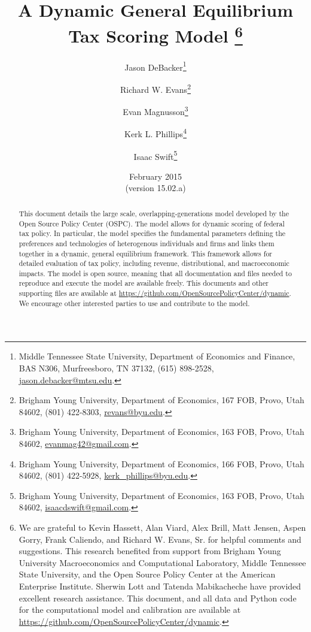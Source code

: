 \documentclass[12pt]{report}
\theoremstyle{definition}
\begin{document}
\begin{titlepage}
  \title{A Dynamic General Equilibrium Tax Scoring Model
    \thanks{We are grateful to Kevin Hassett, Alan Viard, Alex Brill, Matt Jensen, Aspen Gorry, Frank Caliendo, and Richard W. Evans, Sr. for helpful comments and suggestions. This research benefited from support from Brigham Young University Macroeconomics and Computational Laboratory, Middle Tennessee State University, and the Open Source Policy Center at the American Enterprise Institute. Sherwin Lott and Tatenda Mabikacheche have provided excellent research assistance.  This document, and all data and Python code for the computational model and calibration are available at \href{https://github.com/OpenSourcePolicyCenter/dynamic}{https://github.com/OpenSourcePolicyCenter/dynamic}.} }

  \author{
  Jason DeBacker\footnote{Middle Tennessee State University, Department of Economics and Finance, BAS N306, Murfreesboro, TN 37132, (615) 898-2528, \href{mailto:jason.debacker@mtsu.edu}{jason.debacker@mtsu.edu}.} \\[-2pt]
  \and
  Richard W. Evans\footnote{Brigham Young University, Department of Economics, 167 FOB, Provo, Utah 84602, (801) 422-8303, \href{mailto:revans@byu.edu}{revans@byu.edu}.} \\[-2pt]
  \and
  Evan Magnusson\footnote{Brigham Young University, Department of Economics, 163 FOB, Provo, Utah 84602, \href{mailto:evanmag42@gmail.com}{evanmag42@gmail.com}.} \\[-2pt]
  \and
  Kerk L. Phillips\footnote{Brigham Young University, Department of Economics, 166 FOB, Provo, Utah 84602, (801) 422-5928, \href{mailto:kerk_phillips@byu.edu}{kerk\_phillips@byu.edu}.} \\[-2pt]
  \and
  Isaac Swift\footnote{Brigham Young University, Department of Economics, 163 FOB, Provo, Utah 84602, \href{mailto:isaacdswift@gmail.com}{isaacdswift@gmail.com}.} \\[-2pt]}
  \date{February 2015 \\
  \scriptsize{(version 15.02.a)}}
  \maketitle
  \begin{abstract}
  \small{This document details the large scale, overlapping-generations model developed by the Open Source Policy Center (OSPC).  The model allows for dynamic scoring of federal tax policy.  In particular, the model specifies the fundamental parameters defining the preferences and technologies of heterogenous individuals and firms and links them together in a dynamic, general equilibrium framework.  This framework allows for detailed evaluation of tax policy, including revenue, distributional, and macroeconomic impacts.  The model is open source, meaning that all documentation and files needed to reproduce and execute the model are available freely.  This documents and other supporting files are available at \href{https://github.com/OpenSourcePolicyCenter/dynamic}{https://github.com/OpenSourcePolicyCenter/dynamic}.  We encourage other interested parties to use and contribute to the model.}


\end{abstract}
\end{titlepage}
\end{document}
